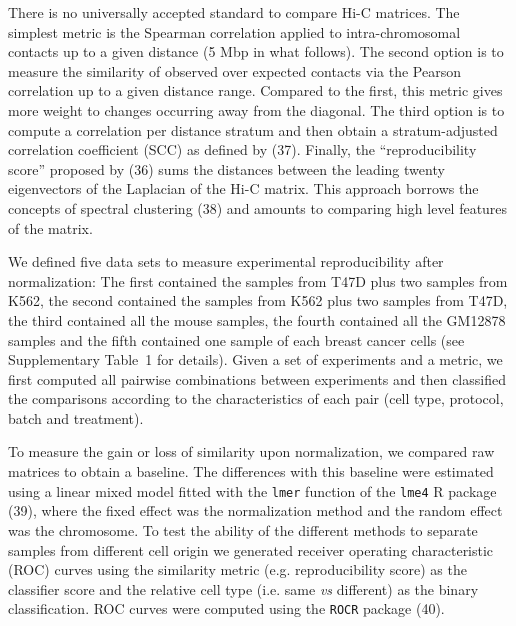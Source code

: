 \documentclass[a4,center,fleqn]{NAR}
\providecommand{\DIFadd}[1]{{\protect\color{red}#1}} %
\providecommand{\DIFdel}[1]{{\protect}}                      %
\providecommand{\DIFaddbegin}{} %
\providecommand{\DIFaddend}{} %
\providecommand{\DIFdelbegin}{} %
\providecommand{\DIFdelend}{} %
\begin{document}
There is no universally accepted standard to compare Hi-C matrices. The
simplest metric is the Spearman correlation applied to intra-chromosomal
contacts up to a given distance (5 Mbp in what follows). The second option
is to measure the similarity of observed over expected contacts via the
Pearson correlation up to a given distance range. Compared to the first,
this metric gives more weight to changes occurring away from the diagonal.
The third option is to compute a correlation per distance stratum and then
obtain a stratum-adjusted correlation coefficient (SCC) as defined by
(\DIFdelbegin \DIFdel{34}\DIFdelend \DIFaddbegin \DIFadd{37}\DIFaddend ). Finally, the ``reproducibility score'' proposed by
(\DIFdelbegin \DIFdel{33}\DIFdelend \DIFaddbegin \DIFadd{36}\DIFaddend ) sums the distances between the leading twenty
eigenvectors of the Laplacian of the Hi-C matrix. This approach borrows
the concepts of spectral clustering (\DIFdelbegin \DIFdel{35}\DIFdelend \DIFaddbegin \DIFadd{38}\DIFaddend ) and amounts to
comparing high level features of the matrix.

We defined five data sets to measure experimental reproducibility after
normalization: The first contained the samples from T47D plus two samples
from K562, the second contained the samples from K562 plus two samples
from T47D, the third contained all the mouse samples, the fourth contained
all the GM12878 samples and the fifth contained one sample of each breast
cancer cells (see Supplementary Table~1 for details). Given a set of
experiments and a metric, we first computed all pairwise combinations
between experiments and then classified the comparisons according to the
characteristics of each pair (cell type, protocol, batch and treatment).

To measure the gain or loss of similarity upon normalization, we compared
raw matrices to obtain a baseline. The differences with this baseline were
estimated using a linear mixed model fitted with the \texttt{lmer}
function of the \texttt{lme4} R package (\DIFdelbegin \DIFdel{36}\DIFdelend \DIFaddbegin \DIFadd{39}\DIFaddend ), where the
fixed effect was the normalization method and the random effect was the
chromosome. To test the ability of the different methods to separate
samples from different cell origin we generated receiver operating
characteristic (ROC) curves using the similarity metric (e.g.
reproducibility score) as the classifier score and the relative cell type
(i.e. same \textit{vs} different) as the binary classification. ROC curves
were computed using the \texttt{ROCR} package (\DIFdelbegin \DIFdel{37}\DIFdelend \DIFaddbegin \DIFadd{40}\DIFaddend ).
\end{document}

